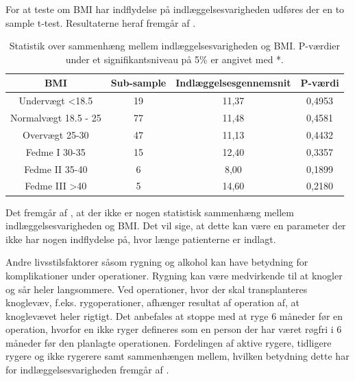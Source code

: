 For at teste om BMI har indflydelse på indlæggelsesvarigheden udføres der en to sample t-test. Resultaterne heraf fremgår af .

\begin{table}[H]
\centering
\begin{tabular}{|c|c|c|c|}
\hline
\textbf{BMI}         & \textbf{Sub-sample} & \textbf{Indlæggelsesgennemsnit} & \textbf{P-værdi} \\ \hline
Undervægt \textless18.5  & 19                  & 11,37                           & 0,4953           \\ \hline
Normalvægt 18.5 - 25     & 77                  & 11,48                           & 0,4581           \\ \hline
Overvægt 25-30           & 47                  & 11,13                           & 0,4432           \\ \hline
Fedme I 30-35            & 15                  & 12,40                           & 0,3357           \\ \hline
Fedme II 35-40           & 6                   & 8,00                            & 0,1899           \\ \hline
Fedme III \textgreater40 & 5                   & 14,60                           & 0,2180           \\ \hline
\end{tabular}
\caption{Statistik over sammenhæng mellem indlæggelsesvarigheden og BMI. P-værdier under et signifikantsniveau på 5\% er angivet med *.}
\label{BMIindlaegtab}
\end{table}

\noindent
Det fremgår af , at der ikke er nogen statistisk sammenhæng mellem indlæggelsesvarigheden og BMI. Det vil sige, at dette kan være en parameter der ikke har nogen indflydelse på, hvor længe patienterne er indlagt.

Andre livsstilsfaktorer såsom rygning og alkohol kan have betydning for komplikationer under operationer. Rygning kan være medvirkende til at knogler og sår heler langsommere. Ved operationer, hvor der skal transplanteres knoglevæv, f.eks. rygoperationer, afhænger resultat af operation af, at knoglevævet heler rigtigt. Det anbefales at stoppe med at ryge 6 måneder før en operation, hvorfor en ikke ryger defineres som en person der har været røgfri i 6 måneder før den planlagte operationen.\cite{Nordjylland2014} Fordelingen af aktive rygere, tidligere rygere og ikke rygerere samt sammenhængen mellem, hvilken betydning dette har for indlæggelsesvarigheden fremgår af .


